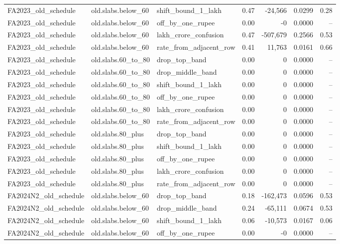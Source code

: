 \begin{table}[t]
\begin{tabular}{lllrrrr}
FA2023\_old\_schedule & old.slabs.below\_60 & shift\_bound\_1\_lakh & 0.47 & -24,566 & 0.0299 & 0.28 \\
FA2023\_old\_schedule & old.slabs.below\_60 & off\_by\_one\_rupee & 0.00 & -0 & 0.0000 & -- \\
FA2023\_old\_schedule & old.slabs.below\_60 & lakh\_crore\_confusion & 0.47 & -507,679 & 0.2566 & 0.53 \\
FA2023\_old\_schedule & old.slabs.below\_60 & rate\_from\_adjacent\_row & 0.41 & 11,763 & 0.0161 & 0.66 \\
FA2023\_old\_schedule & old.slabs.60\_to\_80 & drop\_top\_band & 0.00 & 0 & 0.0000 & -- \\
FA2023\_old\_schedule & old.slabs.60\_to\_80 & drop\_middle\_band & 0.00 & 0 & 0.0000 & -- \\
FA2023\_old\_schedule & old.slabs.60\_to\_80 & shift\_bound\_1\_lakh & 0.00 & 0 & 0.0000 & -- \\
FA2023\_old\_schedule & old.slabs.60\_to\_80 & off\_by\_one\_rupee & 0.00 & 0 & 0.0000 & -- \\
FA2023\_old\_schedule & old.slabs.60\_to\_80 & lakh\_crore\_confusion & 0.00 & 0 & 0.0000 & -- \\
FA2023\_old\_schedule & old.slabs.60\_to\_80 & rate\_from\_adjacent\_row & 0.00 & 0 & 0.0000 & -- \\
FA2023\_old\_schedule & old.slabs.80\_plus & drop\_top\_band & 0.00 & 0 & 0.0000 & -- \\
FA2023\_old\_schedule & old.slabs.80\_plus & shift\_bound\_1\_lakh & 0.00 & 0 & 0.0000 & -- \\
FA2023\_old\_schedule & old.slabs.80\_plus & off\_by\_one\_rupee & 0.00 & 0 & 0.0000 & -- \\
FA2023\_old\_schedule & old.slabs.80\_plus & lakh\_crore\_confusion & 0.00 & 0 & 0.0000 & -- \\
FA2023\_old\_schedule & old.slabs.80\_plus & rate\_from\_adjacent\_row & 0.00 & 0 & 0.0000 & -- \\
FA2024N2\_old\_schedule & old.slabs.below\_60 & drop\_top\_band & 0.18 & -162,473 & 0.0596 & 0.53 \\
FA2024N2\_old\_schedule & old.slabs.below\_60 & drop\_middle\_band & 0.24 & -65,111 & 0.0674 & 0.53 \\
FA2024N2\_old\_schedule & old.slabs.below\_60 & shift\_bound\_1\_lakh & 0.06 & -10,573 & 0.0167 & 0.06 \\
FA2024N2\_old\_schedule & old.slabs.below\_60 & off\_by\_one\_rupee & 0.00 & -0 & 0.0000 & -- \\

\end{tabular}
\end{table}
